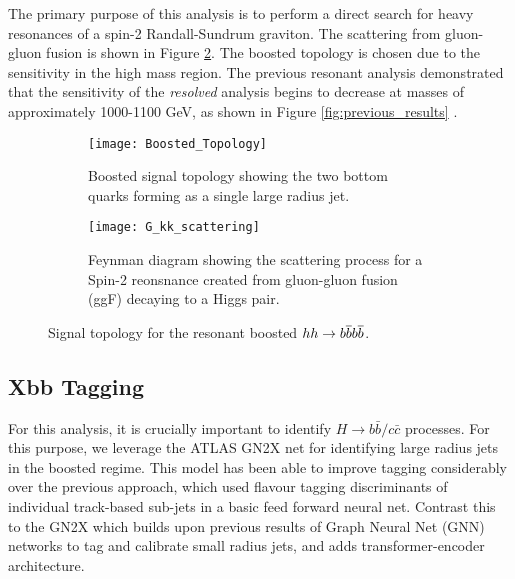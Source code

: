 \documentclass[12pt]{article}
\begin{document}
The primary purpose of this analysis is to perform a direct search for heavy
resonances of a spin-2 Randall-Sundrum graviton. The scattering from gluon-gluon
fusion is shown in Figure \ref{subfig:feynman}. The boosted topology is chosen
due to the sensitivity in the high mass region. The previous resonant analysis
demonstrated that the sensitivity of the \textit{resolved} analysis begins to
decrease at masses of approximately 1000-1100 GeV, as shown in Figure
\ref{fig:previous_results} \cite{atlas_resonant_2022}. 


\begin{figure}[t!]
    \centering
    \begin{subfigure}[t]{.48\textwidth}
        \centering
        \texttt{[image: Boosted\_Topology]}
        \caption{Boosted signal topology showing the two bottom quarks forming as a single large radius jet.}
        \label{subfig:boosted_topology}
    \end{subfigure}
    \hfill
    \begin{subfigure}[t]{.48\textwidth}
        \centering
        \texttt{[image: G\_kk\_scattering]}
        \caption{Feynman diagram showing the scattering process for a Spin-2
        reonsnance created from gluon-gluon fusion (ggF) decaying to a Higgs pair.}
        \label{subfig:feynman}
    \end{subfigure}
    \caption{Signal topology for the resonant boosted $hh\rightarrow b\overline{b}b\overline{b}$.}
\label{fig:signal_topologies}
\end{figure}

\subsection{Xbb Tagging} For this analysis, it is crucially important to
identify $H\rightarrow b\bar{b} / c\bar{c}$ processes. For this purpose, we
leverage the ATLAS GN2X \cite{boosted_hbbcc_tagger} net for identifying large
radius jets in the boosted regime. This model has been able to improve tagging
considerably over the previous approach, which used flavour tagging
discriminants of individual track-based sub-jets in a basic feed forward neural
net. Contrast this to the GN2X which builds upon previous results of Graph
Neural Net (GNN) networks to tag and calibrate small radius jets, and adds
transformer-encoder architecture.

\end{document}
